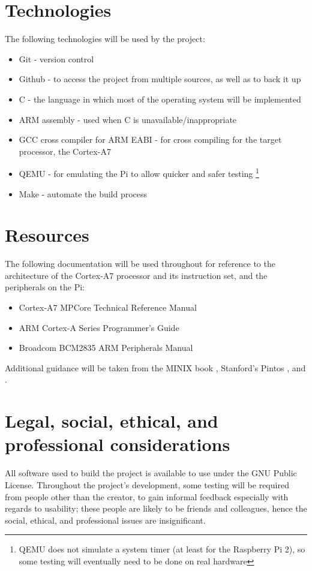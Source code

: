 \documentclass[10pt,a4paper]{article}
\begin{document}

\section*{Technologies}
The following technologies will be used by the project:
\begin{itemize}
    \itemsep0em
    \item Git - version control
    \item Github - to access the project from multiple sources, as well as to
        back it up
    \item C - the language in which most of the operating system will be
        implemented
    \item ARM assembly - used when C is unavailable/inappropriate
        \cite{CannotDoC}
    \item GCC cross compiler for ARM EABI - for cross compiling for the target
        processor, the Cortex-A7 %
    \item QEMU - for emulating the Pi to allow quicker and safer testing
        \footnote{QEMU does not simulate a system timer (at least for the
        Raspberry Pi 2), so some testing will eventually need to be done on real
        hardware}
    \item Make - automate the build process
\end{itemize}

\section*{Resources}
The following documentation will be used throughout for reference to the
architecture of the Cortex-A7 processor and its instruction set, and the
peripherals on the Pi:
\begin{itemize}
    \itemsep0em
    \item Cortex-A7 MPCore Technical Reference Manual
    \item ARM Cortex-A Series Programmer's Guide
    \item Broadcom BCM2835 ARM Peripherals Manual
\end{itemize}

Additional guidance will be taken from the MINIX book \cite{MINIX}, Stanford's
Pintos \cite{Pintos}, and \cite{jsandler}.

\section*{Legal, social, ethical, and professional  considerations}
All software used to build the project is available to use under the GNU Public
License. Throughout the project's development, some testing will be required
from people other than the creator, to gain informal feedback especially with
regards to usability; these people are likely to be friends and colleagues,
hence the social, ethical, and professional issues are insignificant.
\end{document}
